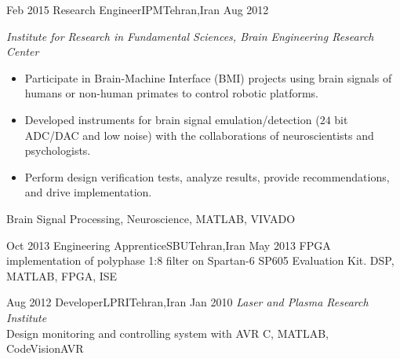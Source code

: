 \begin{experiences}
  \emptySeparator

  \experience
  {Feb 2015} {Research Engineer}{IPM}{Tehran,Iran}
  {Aug 2012} {
    \emph{Institute for Research in Fundamental Sciences, Brain Engineering Research Center}
    \begin{itemize}
      \item Participate in Brain-Machine Interface (BMI) projects using brain
            signals of humans or non-human primates to control robotic platforms.
      \item Developed instruments for brain signal emulation/detection
            ($24$ bit ADC/DAC and low noise) with the collaborations of
            neuroscientists and psychologists.
      \item Perform design verification tests, analyze results, provide
            recommendations, and drive implementation.
    \end{itemize}
  }
  {Brain Signal Processing, Neuroscience, MATLAB, VIVADO}

  \emptySeparator

  \experience
  {Oct 2013} {Engineering Apprentice}{SBU}{Tehran,Iran}
  {May 2013} {
    FPGA implementation of polyphase 1:8 filter on Spartan-6 SP605 Evaluation Kit.
  }
  {DSP, MATLAB, FPGA, ISE}

  \emptySeparator

  \experience
  {Aug 2012} {Developer}{LPRI}{Tehran,Iran}
  {Jan 2010} {
    \emph{Laser and Plasma Research Institute}\\
    Design  monitoring and controlling system with AVR
  }
  {C, MATLAB, CodeVisionAVR}
\end{experiences}

